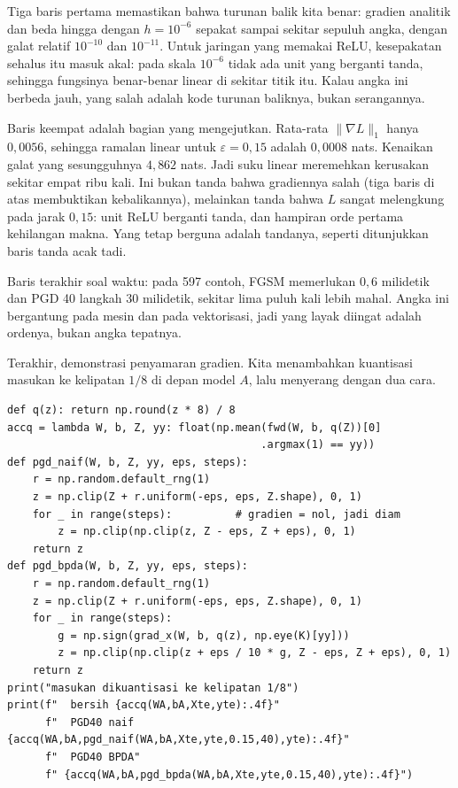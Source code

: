 Tiga baris pertama memastikan bahwa turunan balik kita benar: gradien analitik dan
beda hingga dengan $h=10^{-6}$ sepakat sampai sekitar sepuluh angka, dengan galat
relatif $10^{-10}$ dan $10^{-11}$. Untuk jaringan yang memakai ReLU, kesepakatan
sehalus itu masuk akal: pada skala $10^{-6}$ tidak ada unit yang berganti tanda,
sehingga fungsinya benar-benar linear di sekitar titik itu. Kalau angka ini berbeda
jauh, yang salah adalah kode turunan baliknya, bukan serangannya.

Baris keempat adalah bagian yang mengejutkan. Rata-rata $\lVert\nabla L\rVert_1$ hanya
$0{,}0056$, sehingga ramalan linear untuk $\varepsilon=0{,}15$ adalah $0{,}0008$
nats. Kenaikan galat yang sesungguhnya $4{,}862$ nats. Jadi suku linear
meremehkan kerusakan sekitar empat ribu kali. Ini bukan tanda bahwa gradiennya salah
(tiga baris di atas membuktikan kebalikannya), melainkan tanda bahwa $L$ sangat
melengkung pada jarak $0{,}15$: unit ReLU berganti tanda, dan hampiran orde pertama
kehilangan makna. Yang tetap berguna adalah tandanya, seperti ditunjukkan baris
tanda acak tadi.

Baris terakhir soal waktu: pada 597 contoh, FGSM memerlukan $0{,}6$ milidetik dan
PGD 40 langkah $30$ milidetik, sekitar lima puluh kali lebih mahal. Angka ini
bergantung pada mesin dan pada vektorisasi, jadi yang layak diingat adalah
ordenya, bukan angka tepatnya.

Terakhir, demonstrasi penyamaran gradien. Kita menambahkan kuantisasi masukan ke
kelipatan $1/8$ di depan model $A$, lalu menyerang dengan dua cara.

\begin{verbatim}
def q(z): return np.round(z * 8) / 8
accq = lambda W, b, Z, yy: float(np.mean(fwd(W, b, q(Z))[0]
                                        .argmax(1) == yy))
def pgd_naif(W, b, Z, yy, eps, steps):
    r = np.random.default_rng(1)
    z = np.clip(Z + r.uniform(-eps, eps, Z.shape), 0, 1)
    for _ in range(steps):          # gradien = nol, jadi diam
        z = np.clip(np.clip(z, Z - eps, Z + eps), 0, 1)
    return z
def pgd_bpda(W, b, Z, yy, eps, steps):
    r = np.random.default_rng(1)
    z = np.clip(Z + r.uniform(-eps, eps, Z.shape), 0, 1)
    for _ in range(steps):
        g = np.sign(grad_x(W, b, q(z), np.eye(K)[yy]))
        z = np.clip(np.clip(z + eps / 10 * g, Z - eps, Z + eps), 0, 1)
    return z
print("masukan dikuantisasi ke kelipatan 1/8")
print(f"  bersih {accq(WA,bA,Xte,yte):.4f}"
      f"  PGD40 naif {accq(WA,bA,pgd_naif(WA,bA,Xte,yte,0.15,40),yte):.4f}"
      f"  PGD40 BPDA"
      f" {accq(WA,bA,pgd_bpda(WA,bA,Xte,yte,0.15,40),yte):.4f}")
\end{verbatim}


